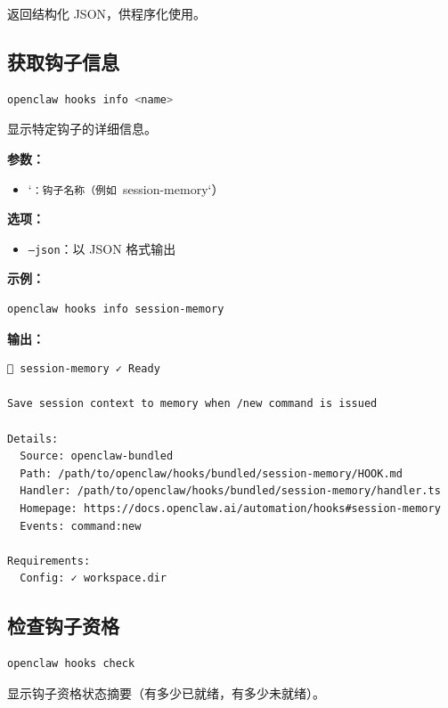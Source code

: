 返回结构化 JSON，供程序化使用。

\subsection{获取钩子信息}


\begin{lstlisting}[language=bash]
openclaw hooks info <name>
\end{lstlisting}


显示特定钩子的详细信息。

\textbf{参数：}

\begin{itemize}
  \item `\texttt{：钩子名称（例如 }session-memory`）
\end{itemize}


\textbf{选项：}

\begin{itemize}
  \item \texttt{--json}：以 JSON 格式输出
\end{itemize}


\textbf{示例：}

\begin{lstlisting}[language=bash]
openclaw hooks info session-memory
\end{lstlisting}


\textbf{输出：}

\begin{lstlisting}
💾 session-memory ✓ Ready

Save session context to memory when /new command is issued

Details:
  Source: openclaw-bundled
  Path: /path/to/openclaw/hooks/bundled/session-memory/HOOK.md
  Handler: /path/to/openclaw/hooks/bundled/session-memory/handler.ts
  Homepage: https://docs.openclaw.ai/automation/hooks#session-memory
  Events: command:new

Requirements:
  Config: ✓ workspace.dir
\end{lstlisting}


\subsection{检查钩子资格}


\begin{lstlisting}[language=bash]
openclaw hooks check
\end{lstlisting}


显示钩子资格状态摘要（有多少已就绪，有多少未就绪）。

